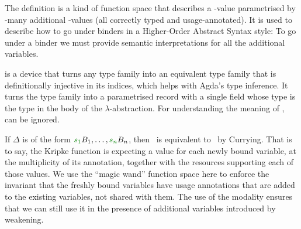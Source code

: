 
The definition
\AgdaSpace{}\AgdaBound{$\V$}\AgdaSpace{}\AgdaBound{$\C$}%
\AgdaSpace{}\AgdaBound{$\Delta$} is a kind
of function space that describes a \AgdaBound{$\C$}-value parametrised by
\AgdaBound{$\Delta$}-many additional \AgdaBound{$\V$}-values (all correctly
typed and usage-annotated).
It is used to describe how to go under binders in a
Higher-Order Abstract Syntax style: To go under a binder we must
provide semantic interpretations for all the additional variables.






is a device that turns any type family into an equivalent type family
that is definitionally injective in its indices, which helps with
Agda's type inference.
It turns the type family into a parametrised
record with a single field  whose type is the type in
the body of the $\lambda$-abstraction.
For understanding the meaning of
,  can be ignored.

If $\Delta$ is of the form $\gr{s_1}B_1, \ldots, \gr{s_n}B_n$, then
\ is equivalent to
\ by Currying.  That is
to say, the Kripke function is expecting a value for each newly bound
variable, at the multiplicity of its annotation, together with the
resources supporting each of those values. We use the ``magic wand''
function space here to enforce the invariant that the freshly bound
variables have usage annotations that are added to the existing
variables, not shared with them. The use of the
 modality ensures that we can still use it in
the presence of additional variables introduced by weakening.

